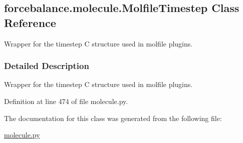 \hypertarget{classforcebalance_1_1molecule_1_1MolfileTimestep}{\subsection{forcebalance.\-molecule.\-Molfile\-Timestep \-Class \-Reference}
\label{classforcebalance_1_1molecule_1_1MolfileTimestep}
}


\-Wrapper for the timestep \-C structure used in molfile plugins.  




\subsubsection{\-Detailed \-Description}
\-Wrapper for the timestep \-C structure used in molfile plugins. 



\-Definition at line 474 of file molecule.\-py.



\-The documentation for this class was generated from the following file\-:\begin{DoxyCompactItemize}
\item 
\hyperlink{molecule_8py}{molecule.\-py}\end{DoxyCompactItemize}
